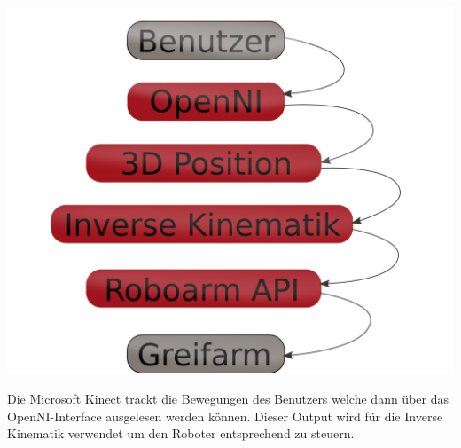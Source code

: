 \documentclass[portrait,a0paper]{baposter}
\begin{document}
\begin{poster}
{\includegraphics[width=\textwidth]{imgs/komponenten.png}

Die Microsoft Kinect trackt die Bewegungen des Benutzers welche dann über das OpenNI-Interface ausgelesen werden können. Dieser Output wird für die Inverse Kinematik verwendet um den Roboter entsprechend zu steuern.
 }
 
%



\end{poster}
\end{document}
